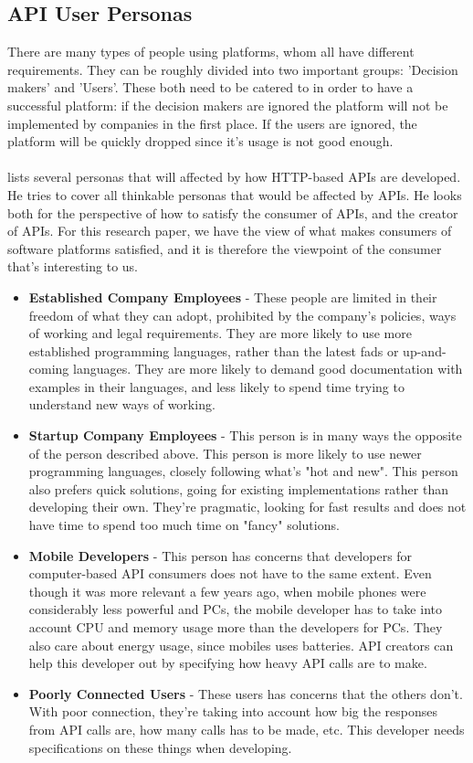 \documentclass{article}
\begin{document}
\subsection{API User Personas}
There are many types of people using platforms, whom all have different
requirements. They can be roughly divided into two important groups:
'Decision makers' and 'Users'. These both need to be catered to in order
to have a successful platform: if the decision makers are ignored the
platform will not be implemented by companies in the first place. If the
users are ignored, the platform will be quickly dropped since it's usage
is not good enough.
\\ \\
\cite{personas} lists several personas that will affected by how HTTP-based APIs are developed. He tries to cover all thinkable personas that would be affected by APIs. He looks both for the perspective of how to satisfy the consumer of APIs, and the creator of APIs. For this research paper, we have the view of what makes consumers of software platforms satisfied, and it is therefore the viewpoint of the consumer that's interesting to us.
\begin{itemize}[label={}]
\item \textbf{Established Company Employees} - These people are limited in their freedom of what they can adopt, prohibited by the company's policies, ways of working and legal requirements. They are more likely to use more established programming languages, rather than the latest fads or up-and-coming languages. They are more likely to demand good documentation with examples in their languages, and less likely to spend time trying to understand new ways of working.
\item \textbf{Startup Company Employees} - This person is in many ways the opposite of the person described above. This person is more likely to use newer programming languages, closely following what's "hot and new". This person also prefers quick solutions, going for existing implementations rather than developing their own. They're pragmatic, looking for fast results and does not have time to spend too much time on "fancy" solutions.
\item \textbf{Mobile Developers} - This person has concerns that developers for computer-based API consumers does not have to the same extent. Even though it was more relevant a few years ago, when mobile phones were considerably less powerful and PCs, the mobile developer has to take into account CPU and memory usage more than the developers for PCs. They also care about energy usage, since mobiles uses batteries. API creators can help this developer out by specifying how heavy API calls are to make.
\item \textbf{Poorly Connected Users} - These users has concerns that the others don't. With poor connection, they're taking into account how big the responses from API calls are, how many calls has to be made, etc. This developer needs specifications on these things when developing.
\end{itemize}
\end{document}
